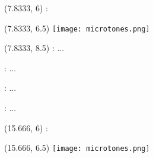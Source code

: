 \documentclass[10pt]{article}
\begin{document}
\begin{textblock}{7.333}(7.8333, 6)
:
\end{textblock}

\begin{textblock}{23}(7.8333, 6.5)
\texttt{[image: microtones.png]}
\end{textblock}

\begin{textblock}{7.333}(7.8333, 8.5)
 : ...

 : ...

 : ...

 : ...
\end{textblock}











\begin{textblock}{7.333}(15.666, 6)
:
\end{textblock}

\begin{textblock}{23}(15.666, 6.5)
\texttt{[image: microtones.png]}
\end{textblock}
\end{document}
